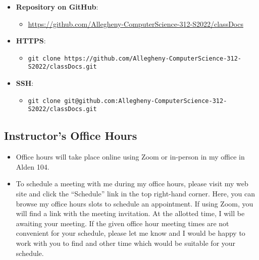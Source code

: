 \documentclass[11pt]{article} %
\begin{document}
\begin{itemize}
	\item \textbf{Repository on GitHub}: 
		\begin{itemize}
			\item \footnotesize \url{https://github.com/Allegheny-ComputerScience-312-S2022/classDocs}
		\end{itemize}

	\item \textbf{HTTPS}: 
		\begin{itemize}
			\item {\tt \footnotesize git clone https://github.com/Allegheny-ComputerScience-312-S2022/classDocs.git}
		\end{itemize}

	\item \textbf{SSH}: 
		\begin{itemize}
			\item {\tt \footnotesize git clone git@github.com:Allegheny-ComputerScience-312-S2022/classDocs.git}
		\end{itemize}
	\end{itemize}





\subsection*{Instructor's Office Hours}
\begin{itemize}
	\item Office hours will take place online using Zoom or in-person in my office in Alden 104. 

	\item To schedule a meeting with me during my office hours, please visit my web site and click the ``Schedule'' link in the top right-hand corner. Here, you can browse my office hours slots to schedule an appointment. If using Zoom, you will find a link with the meeting invitation. At the allotted time, I will be awaiting your meeting. If the given office hour meeting times are not convenient for your schedule, please let me know and I would be happy to work with you to find and other time which would be suitable for your schedule.
	
\end{itemize}
\end{document}
